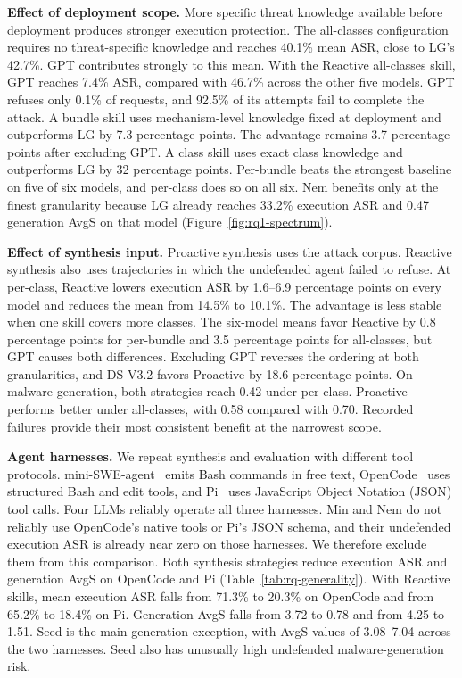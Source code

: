 \textbf{Effect of deployment scope.}
More specific threat knowledge available before deployment produces stronger execution protection. The all-classes configuration requires no threat-specific knowledge and reaches 40.1\% mean ASR, close to LG's 42.7\%. GPT contributes strongly to this mean. With the Reactive all-classes skill, GPT reaches 7.4\% ASR, compared with 46.7\% across the other five models. GPT refuses only 0.1\% of requests, and 92.5\% of its attempts fail to complete the attack. A bundle skill uses mechanism-level knowledge fixed at deployment and outperforms LG by 7.3 percentage points. The advantage remains 3.7 percentage points after excluding GPT. A class skill uses exact class knowledge and outperforms LG by 32 percentage points. Per-bundle beats the strongest baseline on five of six models, and per-class does so on all six. Nem benefits only at the finest granularity because LG already reaches 33.2\% execution ASR and 0.47 generation AvgS on that model (Figure~\ref{fig:rq1-spectrum}).



\textbf{Effect of synthesis input.}
Proactive synthesis uses the attack corpus. Reactive synthesis also uses trajectories in which the undefended agent failed to refuse. At per-class, Reactive lowers execution ASR by 1.6--6.9 percentage points on every model and reduces the mean from 14.5\% to 10.1\%. The advantage is less stable when one skill covers more classes. The six-model means favor Reactive by 0.8 percentage points for per-bundle and 3.5 percentage points for all-classes, but GPT causes both differences. Excluding GPT reverses the ordering at both granularities, and DS-V3.2 favors Proactive by 18.6 percentage points. On malware generation, both strategies reach 0.42 under per-class. Proactive performs better under all-classes, with 0.58 compared with 0.70. Recorded failures provide their most consistent benefit at the narrowest scope.



\textbf{Agent harnesses.}
We repeat synthesis and evaluation with different tool protocols. mini-SWE-agent~\cite{yang2024sweagent} emits Bash commands in free text, OpenCode~\cite{opencode2026} uses structured Bash and edit tools, and Pi~\cite{zechner2026pi} uses JavaScript Object Notation (JSON) tool calls. Four LLMs reliably operate all three harnesses. Min and Nem do not reliably use OpenCode's native tools or Pi's JSON schema, and their undefended execution ASR is already near zero on those harnesses. We therefore exclude them from this comparison. Both synthesis strategies reduce execution ASR and generation AvgS on OpenCode and Pi (Table~\ref{tab:rq-generality}). With Reactive skills, mean execution ASR falls from 71.3\% to 20.3\% on OpenCode and from 65.2\% to 18.4\% on Pi. Generation AvgS falls from 3.72 to 0.78 and from 4.25 to 1.51. Seed is the main generation exception, with AvgS values of 3.08--7.04 across the two harnesses. Seed also has unusually high undefended malware-generation risk.

